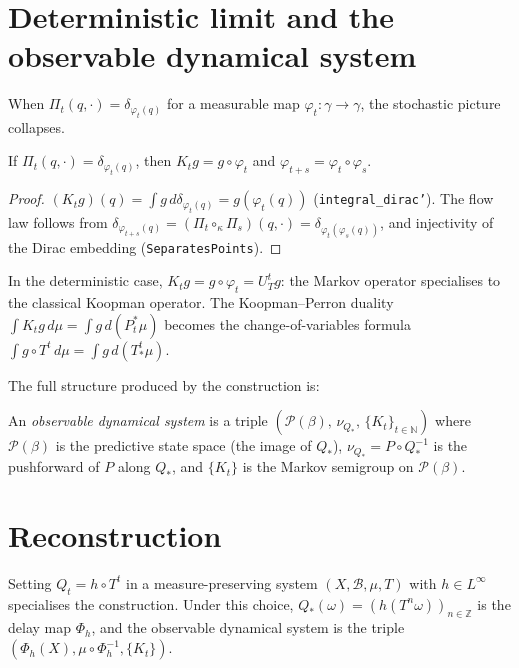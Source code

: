 \section{Deterministic limit and the observable dynamical system}
\label{sec:deterministic}

When $\Pi_t(q, \cdot) = \delta_{\varphi_t(q)}$ for a measurable map
$\varphi_t : \gamma \to \gamma$, the stochastic picture collapses.

\begin{theorem}
\label{thm:deterministic}
If $\Pi_t(q, \cdot) = \delta_{\varphi_t(q)}$, then $K_t g = g \circ \varphi_t$
and $\varphi_{t+s} = \varphi_t \circ \varphi_s$.
\end{theorem}
\begin{proof}
$(K_t g)(q) = \int g\, d\delta_{\varphi_t(q)} = g(\varphi_t(q))$
(\texttt{integral\_dirac'}).  The flow law follows from
$\delta_{\varphi_{t+s}(q)} = (\Pi_t \circ_\kappa \Pi_s)(q, \cdot)
= \delta_{\varphi_t(\varphi_s(q))}$,
and injectivity of the Dirac embedding (\texttt{SeparatesPoints}).
\end{proof}

In the deterministic case, $K_t g = g \circ \varphi_t = U_T^t g$: the Markov
operator specialises to the classical Koopman operator.  The
Koopman--Perron duality $\int K_t g\, d\mu = \int g\, d(P_t^* \mu)$ becomes
the change-of-variables formula $\int g \circ T^t\, d\mu = \int g\, d(T^t_* \mu)$.

The full structure produced by the construction is:

\begin{definition}
\label{def:obs-dyn-sys}
An \emph{observable dynamical system} is a triple
$(\mathcal{P}(\beta),\, \nu_{Q_*},\, \{K_t\}_{t \in \mathbb{N}})$
where $\mathcal{P}(\beta)$ is the predictive state space (the image of $Q_*$),
$\nu_{Q_*} = P \circ Q_*^{-1}$ is the pushforward of $P$ along $Q_*$, and
$\{K_t\}$ is the Markov semigroup on $\mathcal{P}(\beta)$.
\end{definition}

\section{Reconstruction}
\label{sec:bridge}

Setting $Q_t = h \circ T^t$ in a measure-preserving system
$(X, \mathcal{B}, \mu, T)$ with $h \in L^\infty$ specialises the construction.
Under this choice, $Q_*(\omega) = (h(T^n \omega))_{n \in \mathbb{Z}}$ is the
delay map $\Phi_h$, and the observable dynamical system is the triple
$(\Phi_h(X), \mu \circ \Phi_h^{-1}, \{K_t\})$.

